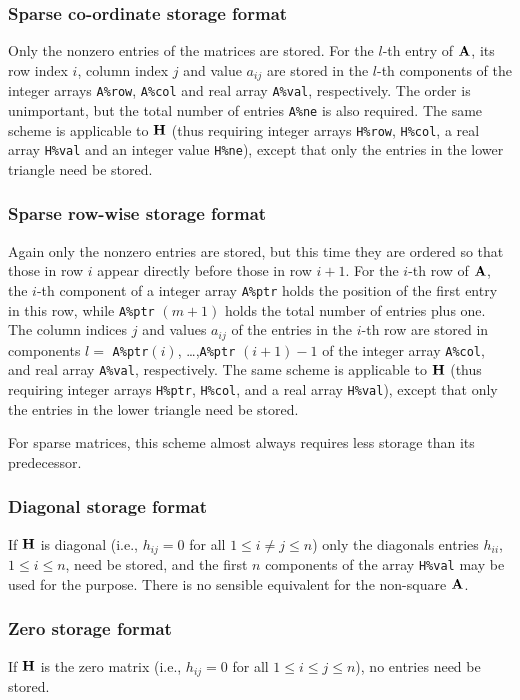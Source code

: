 \documentclass{galahad}
\begin{document}
\subsubsection{Sparse co-ordinate storage format}\label{coordinate}
Only the nonzero entries of the matrices are stored. For the
$l$-th entry of ${\mathbf{A}}$, its row index $i$, column index $j$
and value $a_{ij}$
are stored in the $l$-th components of the integer arrays {\tt A\%row},
{\tt A\%col} and real array {\tt A\%val}, respectively.
The order is unimportant, but the total
number of entries {\tt A\%ne} is also required.
The same scheme is applicable to
${\mathbf{H}}$ (thus requiring integer arrays {\tt H\%row}, {\tt H\%col}, a real array
{\tt H\%val} and an integer value {\tt H\%ne}),
except that only the entries in the lower triangle need be stored.

\subsubsection{Sparse row-wise storage format}\label{rowwise}
Again only the nonzero entries are stored, but this time
they are ordered so that those in row $i$ appear directly before those
in row $i+1$. For the $i$-th row of ${\mathbf{A}}$, the $i$-th component of a
integer array {\tt A\%ptr} holds the position of the first entry in this row,
while {\tt A\%ptr} $(m+1)$ holds the total number of entries plus one.
The column indices $j$ and values $a_{ij}$ of the entries in the $i$-th row
are stored in components
$l =$ {\tt A\%ptr}$(i)$, \ldots ,{\tt A\%ptr} $(i+1)-1$ of the
integer array {\tt A\%col}, and real array {\tt A\%val}, respectively.
The same scheme is applicable to
${\mathbf{H}}$ (thus requiring integer arrays {\tt H\%ptr}, {\tt H\%col}, and
a real array {\tt H\%val}),
except that only the entries in the lower triangle need be stored.

For sparse matrices, this scheme almost always requires less storage than
its predecessor.

\subsubsection{Diagonal storage format}\label{diagonal}
If ${\mathbf{H}}$ is diagonal (i.e., $h_{ij} = 0$ for all $1 \leq i \neq j \leq n$)
only the diagonals entries $h_{ii}$, $1 \leq i \leq n$,  need be stored,
and the first $n$ components of the array {\tt H\%val} may be used for
the purpose. There is no sensible equivalent for the non-square ${\mathbf{A}}$.

\subsubsection{Zero storage format}\label{zero}
If ${\mathbf{H}}$ is the zero matrix (i.e., $h_{ij} = 0$ for all 
$1 \leq i \leq j \leq n$), no entries need be stored.
\end{document}

